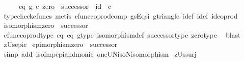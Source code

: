 \begin{isabellebody}
\ \ \isamarkupfalse%
\ \isamarkupfalse%
\ eq{}{\isacharcolon}{\kern0pt}\ {\isachardoublequoteopen}g\ {\isasymcirc}\isactrlsub c\ {\isacharparenleft}{\kern0pt}zero\ {\isasymamalg}\ successor{\isacharparenright}{\kern0pt}\ {\isacharequal}{\kern0pt}\ id{\isacharparenleft}{\kern0pt}{\isasymone}\ {\isasymCoprod}\ {\isasymnat}\isactrlsub c{\isacharparenright}{\kern0pt}{\isachardoublequoteclose}\isanewline
\ \ \ \ \isamarkupfalse%
\ {\isacharparenleft}{\kern0pt}typecheck{\isacharunderscore}{\kern0pt}cfuncs{\isacharcomma}{\kern0pt}\ metis\ cfunc{\isacharunderscore}{\kern0pt}coprod{\isacharunderscore}{\kern0pt}comp\ g{\isacharunderscore}{\kern0pt}sEqs{\isacharunderscore}{\kern0pt}i{}\ g{\isacharunderscore}{\kern0pt}triangle\ i{}{\isacharunderscore}{\kern0pt}def\ i{}{\isacharunderscore}{\kern0pt}def\ id{\isacharunderscore}{\kern0pt}coprod{\isacharparenright}{\kern0pt}\isanewline
\ \ \isamarkupfalse%
\ {\isachardoublequoteopen}isomorphism{\isacharparenleft}{\kern0pt}zero\ {\isasymamalg}\ successor{\isacharparenright}{\kern0pt}{\isachardoublequoteclose}\isanewline
\ \ \ \ \isamarkupfalse%
\ cfunc{\isacharunderscore}{\kern0pt}coprod{\isacharunderscore}{\kern0pt}type\ eq{}\ eq{}\ g{\isacharunderscore}{\kern0pt}type\ isomorphism{\isacharunderscore}{\kern0pt}def{}\ successor{\isacharunderscore}{\kern0pt}type\ zero{\isacharunderscore}{\kern0pt}type\ \isamarkupfalse%
\ blast\isanewline
{}\isamarkupfalse%
%
\endisatagproof
{\isafoldproof}%
%
\isadelimproof
\isanewline
%
\endisadelimproof
\isanewline
{}\isamarkupfalse%
\ zUs{\isacharunderscore}{\kern0pt}epic{\isacharcolon}{\kern0pt}\isanewline
\ {\isachardoublequoteopen}epimorphism{\isacharparenleft}{\kern0pt}zero\ {\isasymamalg}\ successor{\isacharparenright}{\kern0pt}{\isachardoublequoteclose}\isanewline
%
\isadelimproof
\ \ %
\endisadelimproof
%
\isatagproof
{}\isamarkupfalse%
\ {\isacharparenleft}{\kern0pt}simp\ add{\isacharcolon}{\kern0pt}\ iso{\isacharunderscore}{\kern0pt}imp{\isacharunderscore}{\kern0pt}epi{\isacharunderscore}{\kern0pt}and{\isacharunderscore}{\kern0pt}monic\ oneUN{\isacharunderscore}{\kern0pt}iso{\isacharunderscore}{\kern0pt}N{\isacharunderscore}{\kern0pt}isomorphism{\isacharparenright}{\kern0pt}%
\endisatagproof
{\isafoldproof}%
%
\isadelimproof
\isanewline
%
\endisadelimproof
\isanewline
{}\isamarkupfalse%
\ zUs{\isacharunderscore}{\kern0pt}surj{\isacharcolon}{\kern0pt}\isanewline

\end{isabellebody}
